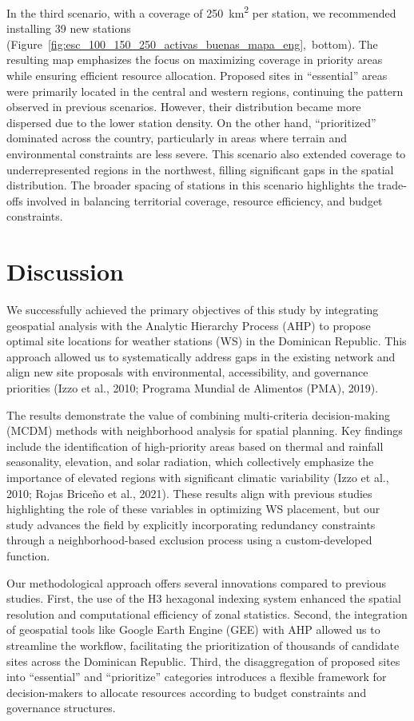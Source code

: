 \documentclass[spanish]{article}
\begin{document}
In the third scenario, with a coverage of 250~km\textsuperscript{2} per
station, we recommended installing 39 new stations
(Figure~\ref{fig:esc_100_150_250_activas_buenas_mapa_eng},~bottom). The
resulting map emphasizes the focus on maximizing coverage in priority
areas while ensuring efficient resource allocation. Proposed sites in
``essential'' areas were primarily located in the central and western
regions, continuing the pattern observed in previous scenarios. However,
their distribution became more dispersed due to the lower station
density. On the other hand, ``prioritized'' dominated across the
country, particularly in areas where terrain and environmental
constraints are less severe. This scenario also extended coverage to
underrepresented regions in the northwest, filling significant gaps in
the spatial distribution. The broader spacing of stations in this
scenario highlights the trade-offs involved in balancing territorial
coverage, resource efficiency, and budget constraints.

\hypertarget{discussion}{%
\section{Discussion}\label{discussion}}

We successfully achieved the primary objectives of this study by
integrating geospatial analysis with the Analytic Hierarchy Process
(AHP) to propose optimal site locations for weather stations (WS) in the
Dominican Republic. This approach allowed us to systematically address
gaps in the existing network and align new site proposals with
environmental, accessibility, and governance priorities (Izzo et al.,
2010; Programa Mundial de Alimentos (PMA), 2019).

The results demonstrate the value of combining multi-criteria
decision-making (MCDM) methods with neighborhood analysis for spatial
planning. Key findings include the identification of high-priority areas
based on thermal and rainfall seasonality, elevation, and solar
radiation, which collectively emphasize the importance of elevated
regions with significant climatic variability (Izzo et al., 2010; Rojas
Briceño et al., 2021). These results align with previous studies
highlighting the role of these variables in optimizing WS placement, but
our study advances the field by explicitly incorporating redundancy
constraints through a neighborhood-based exclusion process using a
custom-developed function.

Our methodological approach offers several innovations compared to
previous studies. First, the use of the H3 hexagonal indexing system
enhanced the spatial resolution and computational efficiency of zonal
statistics. Second, the integration of geospatial tools like Google
Earth Engine (GEE) with AHP allowed us to streamline the workflow,
facilitating the prioritization of thousands of candidate sites across
the Dominican Republic. Third, the disaggregation of proposed sites into
``essential'' and ``prioritize'' categories introduces a flexible
framework for decision-makers to allocate resources according to budget
constraints and governance structures.
\end{document}
